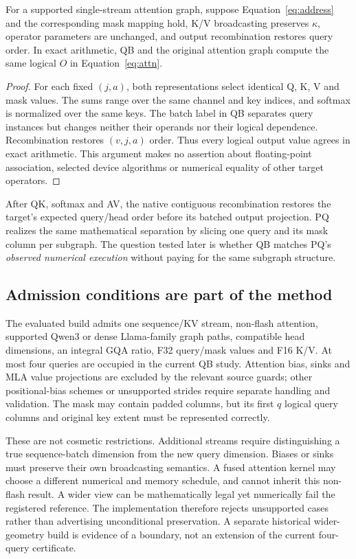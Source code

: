 \begin{proposition}
For a supported single-stream attention graph, suppose Equation~\eqref{eq:address} and the corresponding mask mapping hold, K/V broadcasting preserves $\kappa$, operator parameters are unchanged, and output recombination restores query order. In exact arithmetic, QB and the original attention graph compute the same logical $O$ in Equation~\eqref{eq:attn}.
\end{proposition}
\begin{proof}
For each fixed $(j,a)$, both representations select identical Q, K, V and mask values. The sums range over the same channel and key indices, and softmax is normalized over the same keys. The batch label in QB separates query instances but changes neither their operands nor their logical dependence. Recombination restores $(v,j,a)$ order. Thus every logical output value agrees in exact arithmetic. This argument makes no assertion about floating-point association, selected device algorithms or numerical equality of other target operators.
\end{proof}

After QK, softmax and AV, the native contiguous recombination restores the target's expected query/head order before its batched output projection. PQ realizes the same mathematical separation by slicing one query and its mask column per subgraph. The question tested later is whether QB matches PQ's \emph{observed numerical execution} without paying for the same subgraph structure.

\subsection{Admission conditions are part of the method}
The evaluated build admits one sequence/KV stream, non-flash attention, supported Qwen3 or dense Llama-family graph paths, compatible head dimensions, an integral GQA ratio, F32 query/mask values and F16 K/V. At most four queries are occupied in the current QB study. Attention bias, sinks and MLA value projections are excluded by the relevant source guards; other positional-bias schemes or unsupported strides require separate handling and validation. The mask may contain padded columns, but its first $q$ logical query columns and original key extent must be represented correctly.

These are not cosmetic restrictions. Additional streams require distinguishing a true sequence-batch dimension from the new query dimension. Biases or sinks must preserve their own broadcasting semantics. A fused attention kernel may choose a different numerical and memory schedule, and cannot inherit this non-flash result. A wider view can be mathematically legal yet numerically fail the registered reference. The implementation therefore rejects unsupported cases rather than advertising unconditional preservation. A separate historical wider-geometry build is evidence of a boundary, not an extension of the current four-query certificate.


